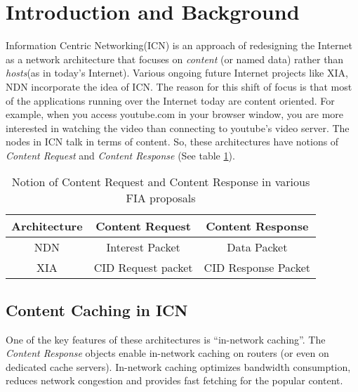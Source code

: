  \section{Introduction and Background}
\label{intro}
Information Centric Networking(ICN) is an approach of redesigning the
Internet as a network architecture that focuses on \emph{content} (or
named data) rather than \emph{hosts}(as in today's Internet). Various
ongoing future Internet projects like XIA\cite{xia}, NDN\cite{ndn}
incorporate the idea of ICN. The reason for this shift of focus is that
most of the applications running over the Internet today are content
oriented. For example, when you access youtube.com in your browser
window, you are more interested in watching the video than connecting
to youtube's video server. The nodes in ICN talk in terms of
content. So, these architectures have notions of \emph{Content
  Request} and \emph{Content Response} (See table
\ref{table:content}).

\begin{table}
  \begin{center}
    \begin{tabular} {c c c}
      Architecture & Content Request & Content Response \\
      \hline
      NDN & Interest Packet & Data Packet \\
      XIA & CID Request packet & CID Response Packet \\
    \end{tabular}
    \caption{Notion of Content Request and Content Response in various
    FIA proposals}
    \label{table:content}
  \end{center}
\end{table}

\subsection{Content Caching in ICN}
\label{intro_caching}
One of the key features of these architectures is ``in-network
caching''. The \emph{Content Response} objects enable in-network
caching on routers (or even on dedicated cache servers). In-network
caching optimizes bandwidth consumption, reduces network congestion
and provides fast fetching for the popular content.


